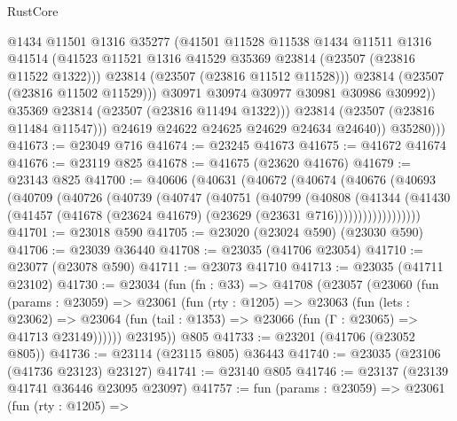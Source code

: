 \begin{lexlean}{RustCore}
\begin{coremodule}
                        @1434
                        @11501
                        @1316
                        @35277
                        (@41501
                          @11528
                          @11538
                          @1434
                          @11511
                          @1316
                          @41514
                          (@41523 @11521 @1316 @41529 @35369 @23814 (@23507 (@23816 @11522 @1322)))
                          @23814
                          (@23507 (@23816 @11512 @11528)))
                        @23814
                        (@23507 (@23816 @11502 @11529)))
                      @30971
                      @30974
                      @30977
                      @30981
                      @30986
                      @30992))
                  @35369
                  @23814
                  (@23507 (@23816 @11494 @1322)))
                @23814
                (@23507 (@23816 @11484 @11547)))
              @24619
              @24622
              @24625
              @24629
              @24634
              @24640))
          @35280)))
@41673 := @23049 @716
@41674 := @23245 @41673
@41675 := @41672 @41674
@41676 := @23119 @825
@41678 := @41675 (@23620 @41676)
@41679 := @23143 @825
@41700 := @40606
    (@40631
      (@40672
        (@40674
          (@40676
            (@40693
              (@40709
                (@40726
                  (@40739
                    (@40747
                      (@40751
                        (@40799
                          (@40808
                            (@41344
                              (@41430
                                (@41457
                                  (@41678 (@23624 @41679) (@23629 (@23631 @716))))))))))))))))))
@41701 := @23018 @590
@41705 := @23020 (@23024 @590) (@23030 @590)
@41706 := @23039 @36440
@41708 := @23035 (@41706 @23054)
@41710 := @23077 (@23078 @590)
@41711 := @23073 @41710
@41713 := @23035 (@41711 @23102)
@41730 := @23034
    (fun (fn : @33) =>
    @41708
      (@23057
        (@23060
          (fun (params : @23059) =>
          @23061
            (fun (rty : @1205) =>
            @23063
              (fun (lets : @23062) =>
              @23064 (fun (tail : @1353) => @23066 (fun (Γ : @23065) => @41713 @23149))))))
        @23195))
    @805
@41733 := @23201 (@41706 (@23052 @805))
@41736 := @23114 (@23115 @805) @36443
@41740 := @23035 (@23106 (@41736 @23123) @23127)
@41741 := @23140 @805
@41746 := @23137 (@23139 @41741 @36446 @23095 @23097)
@41757 := fun (params : @23059) =>
  @23061
    (fun (rty : @1205) =>

\end{coremodule}
\end{lexlean}
